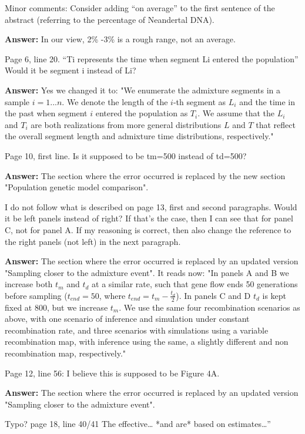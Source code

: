 \documentclass[11pt]{article}
\begin{document}
Minor comments:
Consider adding “on average” to the first sentence of the abstract (referring to the percentage of Neandertal DNA).

\textbf{Answer:} In our view, 2\% -3\% is a rough range, not an average.

Page 6, line 20. “Ti represents the time when segment Li entered the population” Would it be segment i instead of Li? 

\textbf{Answer:} Yes we changed it to: "We enumerate the admixture segments in a sample $i=1...n$. We denote the length of the $i$-th segment as $L_i$ and the time in the past when segment $i$ entered the population as $T_i$. We assume that the $L_i$ and $T_i$ are both realizations from more general distributions $L$ and $T$ that reflect the overall segment length and admixture time distributions, respectively."

Page 10, first line. Is it supposed to be tm=500 instead of td=500?

\textbf{Answer:} The section where the error occurred is replaced by the new section "Population genetic model comparison".


I do not follow what is described on page 13, first and second paragraphs. Would it be left panels instead of right? If that’s the case, then I can see that for panel C, not for panel A. If my reasoning is correct, then also change the reference to the right panels (not left) in the next paragraph.

\textbf{Answer:} The section where the error occurred is replaced by an updated version "Sampling closer to the admixture event". It reads now: "In panels A and B we increase both $t_m$ and $t_d$ at a similar rate, such that gene flow ends 50 generations before sampling ($t_{end}=50$, where $t_{end}= t_m - \frac{t_d}{2}$). In panels C and D $t_d$ is kept fixed at 800, but we increase $t_m$. We use the same four recombination scenarios as above, with one scenario of inference and simulation under constant recombination rate, and three scenarios with simulations using a variable recombination map, with inference using the same, a slightly different and non recombination map, respectively."

Page 12, line 56: I believe this is supposed to be Figure 4A. 

\textbf{Answer:} The section where the error occurred is replaced by an updated version "Sampling closer to the admixture event".

Typo? page 18, line 40/41 The effective… *and are* based on estimates…” 
\end{document}
